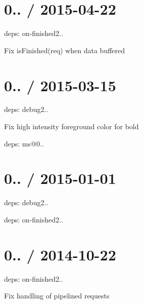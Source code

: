 \section*{0.. / 2015-\/04-\/22 }


\begin{DoxyItemize}
\item deps\+: on-\/finished2..
\begin{DoxyItemize}
\item Fix {\ttfamily is\+Finished(req)} when data buffered
\end{DoxyItemize}
\end{DoxyItemize}

\section*{0.. / 2015-\/03-\/15 }


\begin{DoxyItemize}
\item deps\+: debug2..
\begin{DoxyItemize}
\item Fix high intensity foreground color for bold
\item deps\+: ms@0..
\end{DoxyItemize}
\end{DoxyItemize}

\section*{0.. / 2015-\/01-\/01 }


\begin{DoxyItemize}
\item deps\+: debug2..
\item deps\+: on-\/finished2..
\end{DoxyItemize}

\section*{0.. / 2014-\/10-\/22 }


\begin{DoxyItemize}
\item deps\+: on-\/finished2..
\begin{DoxyItemize}
\item Fix handling of pipelined requests
\end{DoxyItemize}
\end{DoxyItemize}

